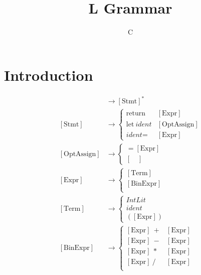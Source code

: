 \documentclass{article}
\title{L Grammar}
\author{C}
\begin{document}
	\maketitle
	\section{Introduction}
	\begin{align*} 
		[\text{Prog}] &\to  [\text{Stmt}]^* \\ 
		[\text{Stmt}] &\to  
		\begin{cases}
			\text{return} \ &[\text{Expr}] \\
			\text{let} \ \textit{ident} &[\text{OptAssign}] \\
			\textit{ident} = &[\text{Expr}]
		\end{cases} \\
		[\text{OptAssign}] &\to
		\begin{cases}
			= [\text{Expr}]\\
			[\quad]
		\end{cases} \\
		[\text{Expr}]	&\to 
		\begin{cases}
			[\text{Term}] \\
			[\text{BinExpr}] \\
		\end{cases} \\	
		[\text{Term}]	&\to 
		\begin{cases}
			\textit{IntLit} \\
			\textit{ident} \\
			([\text{Expr}])
		\end{cases} \\	
		[\text{BinExpr}]	&\to 
		\begin{cases}
			[\text{Expr}]\ + &[\text{Expr}] \\
			[\text{Expr}]\ - &[\text{Expr}] \\
			[\text{Expr}]\ * &[\text{Expr}] \\
			[\text{Expr}]\ / &[\text{Expr}] \\
		\end{cases}
	\end{align*}
\end{document}
